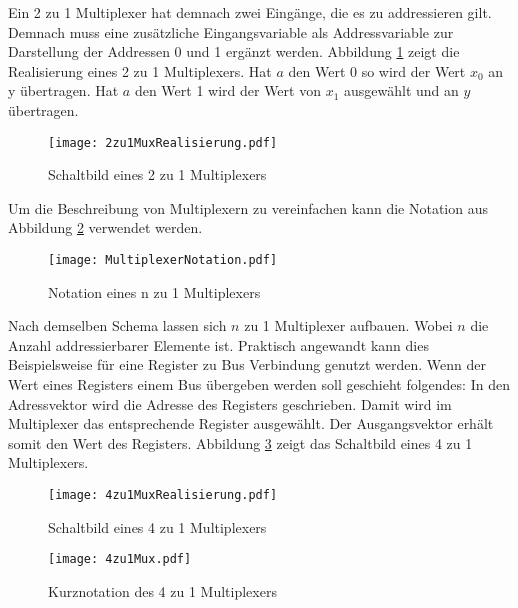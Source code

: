 Ein 2 zu 1 Multiplexer hat demnach zwei Eingänge, die es zu addressieren gilt. Demnach muss eine zusätzliche Eingangsvariable als Addressvariable zur Darstellung der Addressen 0 und 1 ergänzt werden. Abbildung \ref{2zu1MuxReal} zeigt die Realisierung eines 2 zu 1 Multiplexers. Hat $a$ den Wert 0 so wird der Wert $x_0$ an y übertragen. Hat $a$ den Wert 1 wird der Wert von $x_1$ ausgewählt und an $y$ übertragen.
\begin{figure}[htp]
	\centering
	\texttt{[image: 2zu1MuxRealisierung.pdf]}
	\caption{Schaltbild eines 2 zu 1 Multiplexers}
	\label{2zu1MuxReal}
\end{figure}

Um die Beschreibung von Multiplexern zu vereinfachen kann die Notation aus Abbildung \ref{MulNot} verwendet werden.
\begin{figure}[htp]
	\centering
	\texttt{[image: MultiplexerNotation.pdf]}
	\caption{Notation eines n zu 1 Multiplexers}
	\label{MulNot}
\end{figure}

Nach demselben Schema lassen sich $n$ zu 1 Multiplexer aufbauen. Wobei $n$ die Anzahl addressierbarer Elemente ist. Praktisch angewandt kann dies Beispielsweise für eine Register zu Bus Verbindung genutzt werden. Wenn der Wert eines Registers einem Bus übergeben werden soll geschieht folgendes: In den Adressvektor wird die Adresse des Registers geschrieben. Damit wird im Multiplexer das entsprechende Register ausgewählt. Der Ausgangsvektor erhält somit den Wert des Registers. Abbildung \ref{4zu1MuxReal} zeigt das Schaltbild eines 4 zu 1 Multiplexers.

\begin{figure}[htp]
	\centering
	\texttt{[image: 4zu1MuxRealisierung.pdf]}
	\caption{Schaltbild eines 4 zu 1 Multiplexers}
	\label{4zu1MuxReal}
\end{figure}

\begin{figure}
	\centering
	\texttt{[image: 4zu1Mux.pdf]}
	\caption{Kurznotation des 4 zu 1 Multiplexers}
\end{figure}


